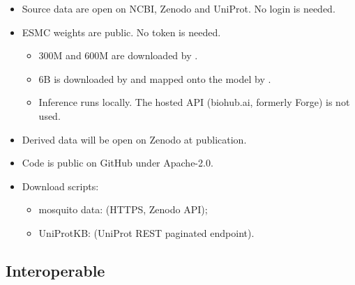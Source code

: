 \documentclass[11pt,a4paper]{article}
\begin{document}
\begin{itemize}
\item Source data are open on NCBI, Zenodo and UniProt. No login is needed.
\item ESMC weights are public. No token is needed.
  \begin{itemize}
  \item 300M and 600M are downloaded by .
  \item 6B is downloaded by  and mapped onto the  model by .
  \item Inference runs locally. The hosted API (biohub.ai, formerly Forge) is not used.
  \end{itemize}
\item Derived data will be open on Zenodo at publication.
\item Code is public on GitHub under Apache-2.0.
\item Download scripts:
  \begin{itemize}
  \item mosquito data:  (HTTPS, Zenodo API);
  \item UniProtKB:  (UniProt REST paginated  endpoint).
  \end{itemize}
\end{itemize}

\subsection{Interoperable}
\end{document}
